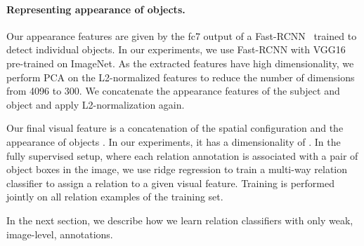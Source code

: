 \documentclass[10pt,twocolumn,letterpaper]{article}
\newcommand{\spaceparagraph}{\vspace{-.35cm}}
\newcommand{\gotoline}{\vspace{.05cm}}
\begin{document}
\spaceparagraph
\paragraph{Representing appearance of objects.} 
Our appearance features are given by the fc7 output of a Fast-RCNN~\cite{girshick15fastrcnn} trained to detect individual objects. In our experiments, we use Fast-RCNN with VGG16 pre-trained on ImageNet. As the extracted features have high dimensionality, we perform PCA on the L2-normalized features to reduce the number of dimensions from 4096 to 300. We concatenate the appearance features of the subject and object and apply L2-normalization again. 

\gotoline
\vspace{4pt}
Our final visual feature is a concatenation of the spatial configuration  and the appearance of objects . In our experiments, it has a dimensionality of . 
In the fully supervised setup, where each relation annotation is associated with a pair of object boxes in the image, we use ridge regression to train a multi-way relation classifier to assign a relation to a given 
visual feature. Training is performed jointly on all relation examples of the training set.

\gotoline
\vspace{4pt}
In the next section, we describe how we learn relation classifiers with only weak, image-level, annotations.  
\end{document}

